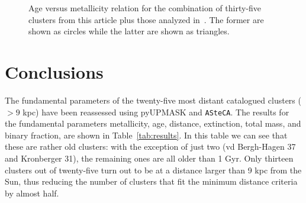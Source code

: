 \documentclass{aa}
\begin{document}
  \begin{figure}
   \caption{Age versus metallicity relation for the combination of thirty-five
   clusters from this article plus those analyzed in~\cite{Perren_2020}. The
   former are shown as circles while the latter are shown as triangles.}
   \label{fig:age_vs_feh}
  \end{figure}








\section{Conclusions}
 \label{sec:conclusions}

  The fundamental parameters of the twenty-five most distant catalogued clusters
  ($>9$ kpc) have been reassessed using pyUPMASK and \texttt{ASteCA}. The
  results for the fundamental parameters metallicity, age, distance,
  extinction, total mass, and binary fraction, are shown in 
  Table~\ref{tab:results}. In this table we can see that these are
  rather old clusters: with the exception of just two (vd Bergh-Hagen 37 and
  Kronberger 31), the remaining ones are all older than 1 Gyr.
  Only thirteen clusters out of twenty-five turn out to be at a distance larger
  than 9 kpc from the Sun, thus reducing the number of clusters that fit the
  minimum distance criteria by almost half.
\end{document}
